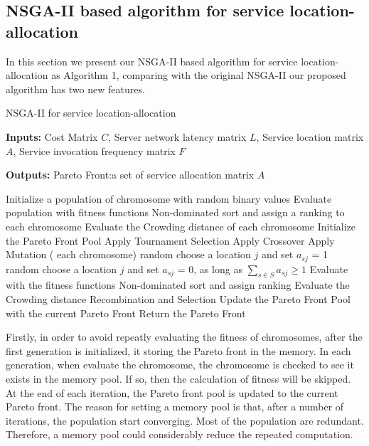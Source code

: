 \documentclass{llncs}
\begin{document}
\subsection{NSGA-II based algorithm for service location-allocation}
In this section we present our NSGA-II based algorithm for service location-allocation as Algorithm 1,
comparing with the original NSGA-II our  proposed algorithm has two new features.
\begin{algorithm}[htb]
	\caption{NSGA-II for service location-allocation}
	\label{NSGA2}
	\textbf{Inputs:}
		Cost Matrix $C$,
		Server network latency matrix $L$, 
		Service location matrix $A$, 
		Service invocation frequency matrix $F$

	\textbf{Outputs:}
		Pareto Front:a  set of service allocation matrix $A$

	\begin{algorithmic}[1]
		\label{alg:1}
		\State Initialize a population of chromosome with random binary values
		\State Evaluate population with fitness functions
		\State Non-dominated sort and assign a ranking to each chromosome
		\State Evaluate the Crowding distance of each chromosome
		\State Initialize the Pareto Front Pool
		\State Apply Tournament Selection
		\State Apply Crossover 
		\State Apply Mutation
		\For( each chromosome)
		\State random choose a location $j$ and set $a_{sj}$ = 1
		\EndWhile
		\State random choose a location $j$ and set $a_{sj}$ = 0, as long as $\sum\limits_{s \in S} a_{sj} \geq 1$
		\EndWhile
		\State Evaluate with the fitness functions
		\EndIf
		\EndFor
		\State Non-dominated sort and assign ranking
		\State Evaluate the Crowding distance
		\State Recombination and Selection
		\State Update the Pareto Front Pool with the current Pareto Front
		\EndWhile
		\State Return the Pareto Front
	\end{algorithmic}
\end{algorithm}

Firstly, in order to avoid repeatly evaluating the fitness
of chromosomes, after the first generation is initialized, it storing the Pareto front 
in the memory. In each generation, when evaluate the chromosome, the chromosome is checked to see it exists in the memory pool. 
If so, then the calculation of fitness will be skipped. At the end of each iteration, the Pareto front pool is updated to the current Pareto front.
The reason for setting a memory pool is that, after a number of iterations, the population start converging. 
Most of the population are redundant. Therefore, a memory pool could considerably reduce the repeated computation.
\end{document}
